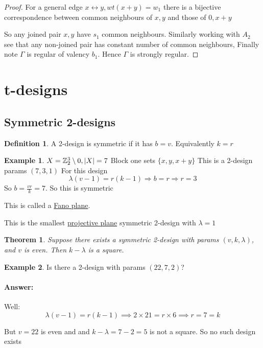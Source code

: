 \documentclass[]{article}
\newtheorem{thm}{Theorem}[section]
\theoremstyle{definition}
\newtheorem*{defn}{Definition}
\newtheorem*{exmp}{Example}
\theoremstyle{remark}
\numberwithin{equation}{section}
\begin{document}
\begin{proof}
				For a general edge $x \longleftrightarrow y, wt(x+y) = w_1$ there is a bijective correspondence between common neighbours of $x,y$ and those of $0, x+y$

				So any joined pair $x, y$ have $s_1$ common neighbours.
				Similarly working with $A_2$ see that any non-joined pair has constant number of common neighbours, Finally note $\Gamma$ is regular of valency $b_1$. Hence $\Gamma$ is strongly regular.
		\end{proof}


\section{t-designs}
	\subsection{Symmetric 2-designs}
		\begin{defn}
			A 2-design is symmetric if it has $b = v$. Equivalently $k = r$
		\end{defn}

		\begin{exmp}
			$X = \mathbb{Z}_2^3 \setminus 0, |X| = 7$
			Block one sets $\{x,y, x+y\}$
			This is a 2-design params $(7,3,1)$
			For this design
			\[
				\lambda(v-1) = r(k-1) \Rightarrow b = r \Rightarrow r = 3
			\]
			So $b = \frac{vr}{k} = 7$. So this is symmetric

			This is called a \underline{Fano plane}.


			This is the smallest \underline{projective plane} symmetric 2-design with $\lambda = 1$
		\end{exmp}

		\begin{thm}
			Suppose there exists a symmetric 2-design with params $(v, k, \lambda)$, and $v$ is even. Then $k-\lambda$ is a square.
		\end{thm}

		\begin{exmp}
			Is there a 2-design with params $(22, 7, 2)$?
		\end{exmp}
			\paragraph*{Answer:} Well:
				\[
					\lambda(v-1) = r(k-1) \implies 2 \times 21 = r \times 6 \implies r = 7 = k
				\]

				But $v = 22$ is even and and $k-\lambda = 7 - 2 = 5$ is not a square. So no such design exists
\end{document}
